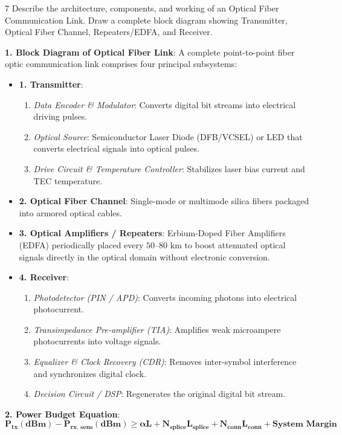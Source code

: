 \begin{theoryq}{7}
Describe the architecture, components, and working of an Optical Fiber Communication Link. Draw a complete block diagram showing Transmitter, Optical Fiber Channel, Repeaters/EDFA, and Receiver.
\end{theoryq}
\begin{theorysol}
\textbf{1. Block Diagram of Optical Fiber Link}:
A complete point-to-point fiber optic communication link comprises four principal subsystems:
\begin{itemize}
    \item \textbf{1. Transmitter}:
    \begin{enumerate}
        \item \textit{Data Encoder \& Modulator}: Converts digital bit streams into electrical driving pulses.
        \item \textit{Optical Source}: Semiconductor Laser Diode (DFB/VCSEL) or LED that converts electrical signals into optical pulses.
        \item \textit{Drive Circuit \& Temperature Controller}: Stabilizes laser bias current and TEC temperature.
    \end{enumerate}
    \item \textbf{2. Optical Fiber Channel}:
    Single-mode or multimode silica fibers packaged into armored optical cables.
    \item \textbf{3. Optical Amplifiers / Repeaters}:
    Erbium-Doped Fiber Amplifiers (EDFA) periodically placed every $50\text{--}80\text{ km}$ to boost attenuated optical signals directly in the optical domain without electronic conversion.
    \item \textbf{4. Receiver}:
    \begin{enumerate}
        \item \textit{Photodetector (PIN / APD)}: Converts incoming photons into electrical photocurrent.
        \item \textit{Transimpedance Pre-amplifier (TIA)}: Amplifies weak microampere photocurrents into voltage signals.
        \item \textit{Equalizer \& Clock Recovery (CDR)}: Removes inter-symbol interference and synchronizes digital clock.
        \item \textit{Decision Circuit / DSP}: Regenerates the original digital bit stream.
    \end{enumerate}
\end{itemize}

\textbf{2. Power Budget Equation}:
\begin{equation}
\mathbf{P_{\text{tx}}(\text{dBm}) - P_{\text{rx, sens}}(\text{dBm}) \ge \alpha L + N_{\text{splice}} L_{\text{splice}} + N_{\text{conn}} L_{\text{conn}} + \text{System Margin}}
\end{equation}
\end{theorysol}
\vspace{4mm}

